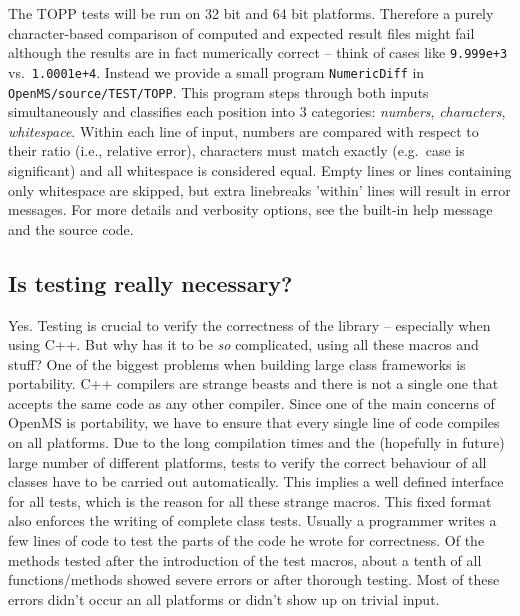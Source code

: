 \documentclass[a4]{article}
\begin{document}
The TOPP tests will be run on 32 bit and 64 bit platforms.  Therefore a purely
character-based comparison of computed and expected result files might fail
although the results are in fact numerically correct -- think of cases like
\texttt{9.999e+3} vs.\ \texttt{1.0001e+4}.  Instead we provide a small program
\texttt{NumericDiff} in \texttt{OpenMS/source/TEST/TOPP}.  This program steps
through both inputs simultaneously and classifies each position into 3
categories: \emph{numbers}, \emph{characters}, \emph{whitespace}.  Within each
line of input, numbers are compared with respect to their ratio (i.e.,
relative error), characters must match exactly (e.g.\ case is significant) and
all whitespace is considered equal.  Empty lines or lines containing only
whitespace are skipped, but extra linebreaks 'within' lines will result in error
messages.  For more details and verbosity options, see the built-in help
message and the source code.

\subsection{Is testing really necessary?}

Yes. Testing is crucial to verify the correctness of the library -- especially when
using C++. But why has it to be {\em so} complicated, using all these macros
and stuff? One of the biggest problems when building large class frameworks is
portability. C++ compilers are strange beasts and there is not a single one
that accepts the same code as any other compiler. Since one of the main
concerns of OpenMS is portability, we have to ensure that every single line of
code compiles on all platforms. Due to the long compilation times and the
(hopefully in future) large number of different platforms, tests to verify the
correct behaviour of all classes have to be carried out automatically. This
implies a well defined interface for all tests, which is the reason for all
these strange macros. This fixed format also enforces the writing of complete
class tests. Usually a programmer writes a few lines of code to test the parts
of the code he wrote for correctness. Of the methods tested after the
introduction of the test macros, about a tenth of all functions/methods showed
severe errors or after thorough testing. Most of these errors didn't occur an
all platforms or didn't show up on trivial input.
\end{document}
